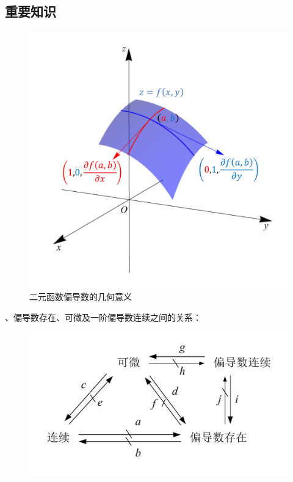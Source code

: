 \documentclass[12pt,UTF8]{ctexart}
\begin{document}
\subsection{重要知识}
\begin{enumerate}
\begin{figure}[H]
\begin{center}
\includegraphics[height=0.5\textheight]{Figures20190607/partialderivative.pdf}
\end{center}
\caption{二元函数偏导数的几何意义}
\end{figure}
、偏导数存在、可微及一阶偏导数连续之间的关系：
\begin{figure}[H]
\begin{center}
\includegraphics[height=0.2\textheight]{Figures20190607/relations.pdf}

\end{center}
\end{figure}
\end{enumerate}
\end{document}
